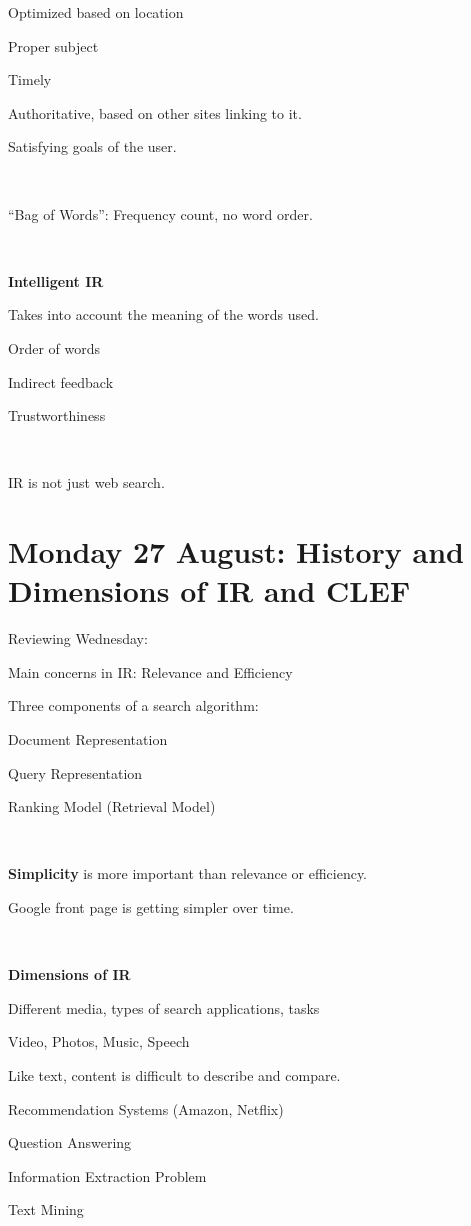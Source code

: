 \documentclass[11pt]{article}
\begin{document}
\begin{spacing}{1.2}
Optimized based on location

Proper subject

Timely

Authoritative, based on other sites linking to it.  

Satisfying goals of the user.  

\

``Bag of Words'':  Frequency count, no word order.  

\

{\bf Intelligent IR}


Takes into account the meaning of the words used.  

Order of words

Indirect feedback

Trustworthiness

\

IR is not just web search.  

\section{Monday 27 August:  History and Dimensions of IR and CLEF}

Reviewing Wednesday:

\qquad Main concerns in IR:  Relevance and Efficiency

\qquad Three components of a search algorithm:  

\qquad \qquad Document Representation

\qquad \qquad Query Representation

\qquad \qquad Ranking Model (Retrieval Model)

\

{\bf Simplicity} is more important than relevance or efficiency.  

Google front page is getting simpler over time.  

\

{\bf Dimensions of IR}

Different media, types of search applications, tasks

\qquad Video, Photos, Music, Speech

\qquad Like text, content is difficult to describe and compare.  


Recommendation Systems (Amazon, Netflix)

Question Answering

\qquad Information Extraction Problem

Text Mining 


\end{spacing}
\end{document}

